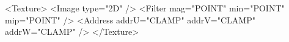 <Texture>
    <Image type="2D" />
    <Filter mag="POINT" min="POINT" mip="POINT" />
    <Address addrU="CLAMP" addrV="CLAMP" addrW="CLAMP" />
</Texture>

